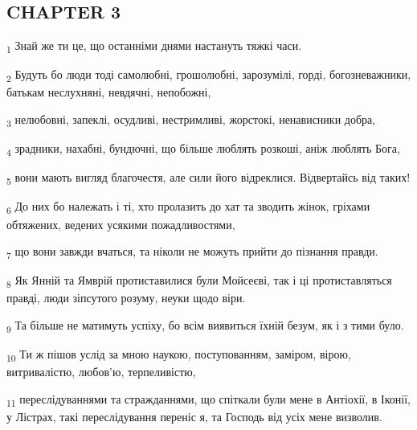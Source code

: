 \subsection{CHAPTER 3}
\begin{tcolorbox}
\textsubscript{1} Знай же ти це, що останніми днями настануть тяжкі часи.
\end{tcolorbox}
\begin{tcolorbox}
\textsubscript{2} Будуть бо люди тоді самолюбні, грошолюбні, зарозумілі, горді, богозневажники, батькам неслухняні, невдячні, непобожні,
\end{tcolorbox}
\begin{tcolorbox}
\textsubscript{3} нелюбовні, запеклі, осудливі, нестримливі, жорстокі, ненависники добра,
\end{tcolorbox}
\begin{tcolorbox}
\textsubscript{4} зрадники, нахабні, бундючні, що більше люблять розкоші, аніж люблять Бога,
\end{tcolorbox}
\begin{tcolorbox}
\textsubscript{5} вони мають вигляд благочестя, але сили його відреклися. Відвертайсь від таких!
\end{tcolorbox}
\begin{tcolorbox}
\textsubscript{6} До них бо належать і ті, хто пролазить до хат та зводить жінок, гріхами обтяжених, ведених усякими пожадливостями,
\end{tcolorbox}
\begin{tcolorbox}
\textsubscript{7} що вони завжди вчаться, та ніколи не можуть прийти до пізнання правди.
\end{tcolorbox}
\begin{tcolorbox}
\textsubscript{8} Як Янній та Ямврій протиставилися були Мойсеєві, так і ці протиставляться правді, люди зіпсутого розуму, неуки щодо віри.
\end{tcolorbox}
\begin{tcolorbox}
\textsubscript{9} Та більше не матимуть успіху, бо всім виявиться їхній безум, як і з тими було.
\end{tcolorbox}
\begin{tcolorbox}
\textsubscript{10} Ти ж пішов услід за мною наукою, поступованням, заміром, вірою, витривалістю, любов'ю, терпеливістю,
\end{tcolorbox}
\begin{tcolorbox}
\textsubscript{11} переслідуваннями та стражданнями, що спіткали були мене в Антіохії, в Іконії, у Лістрах, такі переслідування переніс я, та Господь від усіх мене визволив.
\end{tcolorbox}
